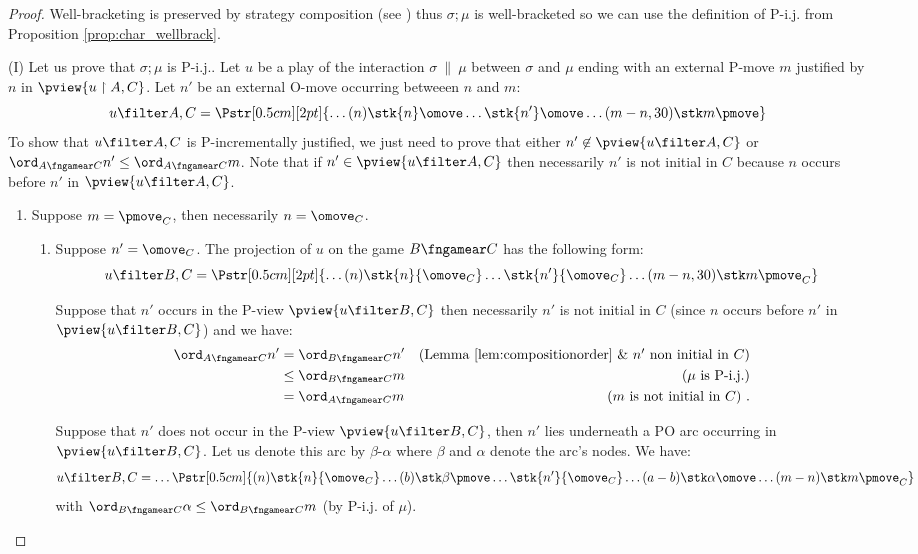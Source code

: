 \begin{proof}
Well-bracketing is preserved by strategy composition (see \cite[Proposition 2.5]{abramsky94full}) thus
$\sigma ; \mu$ is well-bracketed so we can use the definition of P-i.j. from Proposition \ref{prop:char_wellbrack}.

\noindent (I) Let us prove that $\sigma ; \mu$ is P-i.j..
Let $u$ be a play of the interaction $\sigma\ \|\ \mu$ between $\sigma$ and $\mu$
ending with an external P-move $m$
justified by $n$ in $\pview{u \upharpoonright A , C}$.
Let $n'$ be an external O-move occurring betweeen $n$ and $m$:
$$ u \filter A,C =  
\Pstr[0.5cm][2pt]{ \ldots (n){\stk {n} \omove}  \ldots
 {\stk {n'} \omove}  \ldots  (m-n,30){\stk m \pmove}
}
$$
To show that $u \filter A,C$ is P-incrementally justified, we just need to prove that either $n'\not\in \pview{u \filter A,C}$ or $\ord_{A\fngamear C} n' \leq \ord_{A\fngamear C} m$. 
Note that if $n'\in \pview{u \filter A,C}$ 
then necessarily $n'$ is not initial 
in $C$ because $n$ occurs before $n'$ in
$\pview{u \filter A,C}$.

\begin{enumerate}[1)]
\item \label{case:mC}
Suppose $m =\pmove_C$, then necessarily $n=\omove_C$.

\begin{enumerate}
\item \label{case:mCnpC} Suppose $n' = \omove_C$. The projection of $u$ on the game $B\fngamear C$ has the following form:
$$ u \filter B,C =  
\Pstr[0.5cm][2pt]{ \ldots (n){\stk {n} {\omove_C}}  \ldots
 {\stk {n'}{\omove_C}}  \ldots  (m-n,30){\stk m {\pmove_C}}
}$$

Suppose that $n'$ occurs in the P-view $\pview{u\filter B,C}$ then necessarily $n'$ is not initial 
in $C$ (since $n$ occurs before $n'$ in $\pview{u \filter B,C}$) and we have:
\begin{align*}
\ord_{A\fngamear C} n' 
& = \ord_{B\fngamear C} n' & \mbox{(Lemma \ref{lem:compositionorder} \& $n'$ non initial in $C$)} \\
& \leq \ord_{B\fngamear C} m & \mbox{($\mu$ is P-i.j.)} \\
& = \ord_{A\fngamear C} m & \mbox{($m$ is not initial in $C$)} \ .
\end{align*}

Suppose that $n'$ does not occur in the P-view $\pview{u \filter B,C}$, then $n'$ lies underneath a PO arc occurring in $\pview{u \filter B,C}$. Let us denote this arc by $\beta$-$\alpha$ where $\beta$ and $\alpha$ denote the arc's nodes. We have:
$$ u \filter B,C = \ldots  
\Pstr[0.5cm]{
 (n){\stk{n} {\omove_C} } \ldots (b){\stk\beta \pmove} \ldots \stk{n'} {\omove_C}
\ldots (a-b){\stk\alpha \omove}  \ldots (m-n){\stk m {\pmove_C} }
} $$
with $\ord_{B\fngamear C} \alpha \leq \ord_{B\fngamear C} m$ (by P-i.j. of $\mu$).
  

\end{enumerate}
\end{enumerate}
\end{proof}
